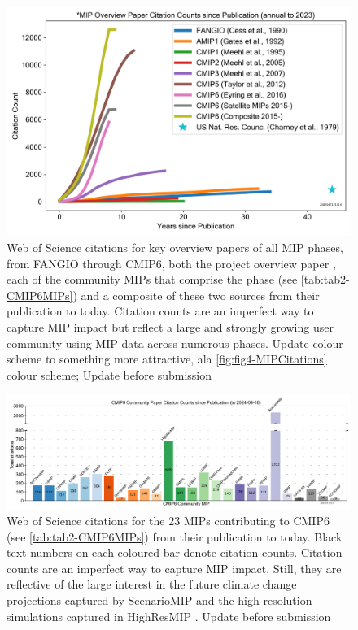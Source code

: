 \documentclass[gmd, preprint]{copernicus}
\def\cred#1{{\color{red}#1}}
\begin{document}
\begin{figure}
    \centering
    \includegraphics[width=1\linewidth]{240916T171314_CMIPOverviewPaperCitations-Counts-3.png}
    \caption{Web of Science citations for key overview papers of all MIP phases, from FANGIO \citep{cess_intercomparison_1990} through CMIP6, both the project overview paper \citep{eyring_overview_2016}, each of the community MIPs that comprise the phase (see \autoref{tab:tab2-CMIP6MIPs}) and a composite of these two sources from their publication to today. Citation counts are an imperfect way to capture MIP impact but reflect a large and strongly growing user community using MIP data across numerous phases. \cred{Update colour scheme to something more attractive, ala \autoref{fig:fig4-MIPCitations} colour scheme; Update before submission}}
    \label{fig:fig3-MIPPhaseCitations}
\end{figure}

\begin{figure}
    \centering
    \includegraphics[width=\textwidth]{240916T171314_CMIPOverviewPaperCitations-Counts-2b-bar.png}
    \caption{Web of Science citations for the 23 MIPs contributing to CMIP6 (see \autoref{tab:tab2-CMIP6MIPs}) from their publication to today. Black text numbers on each coloured bar denote citation counts. Citation counts are an imperfect way to capture MIP impact. Still, they are reflective of the large interest in the future climate change projections captured by ScenarioMIP \citep{oneill_scenario_2016} and the high-resolution simulations captured in HighResMIP \citep{haarsma_high_2016}. \cred{Update before submission}}
    \label{fig:fig4-MIPCitations}
\end{figure}
\end{document}
